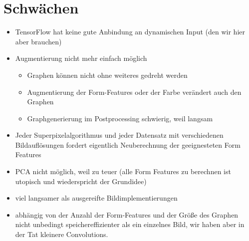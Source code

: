 \section{Schwächen}

\begin{itemize}
  \item TensorFlow hat keine gute Anbindung an dynamischen Input (den wir hier aber brauchen)
  \item Augmentierung nicht mehr einfach möglich
  \begin{itemize}
    \item Graphen können nicht ohne weiteres gedreht werden
    \item Augmentierung der Form-Features oder der Farbe verändert auch den Graphen
    \item Graphgenerierung im Postprocessing schwierig, weil langsam
  \end{itemize}
  \item Jeder Superpixelalgorithmus und jeder Datensatz mit verschiedenen Bildauflösungen fordert eigentlich Neuberechnung der geeignesteten Form Features
  \item PCA nicht möglich, weil zu teuer (alle Form Features zu berechnen ist utopisch und wiederspricht der Grundidee)
  \item viel langsamer als ausgereifte Bildimplementierungen
  \item abhängig von der Anzahl der Form-Features und der Größe des Graphen nicht unbedingt speichereffizienter als ein einzelnes Bild, wir haben aber in der Tat kleinere Convolutions.
\end{itemize}
